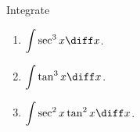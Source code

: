 Integrate 
\begin{enumerate}
\item $\displaystyle \int \sec^3x  \diff x$.

\item $\displaystyle \int \tan^3x \diff x$.

\item $\displaystyle \int \sec^2x\tan^2x \diff x$.

\end{enumerate}